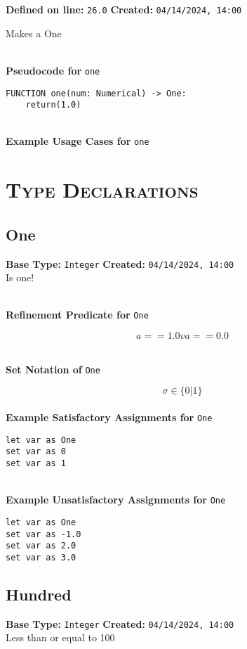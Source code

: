 \documentclass{article}
\begin{document}
\textbf{Defined on line:} \verb|26.0| \hfill \textbf{Created:} \verb|04/14/2024, 14:00| 


Makes a One

\textbf{\\ Pseudocode for } \texttt{one}
\begin{verbatim}
FUNCTION one(num: Numerical) -> One:
	return(1.0)
\end{verbatim}

\textbf{\\ Example Usage Cases for } \texttt{one}
\clearpage

\section{\textsc{Type Declarations}}

\subsection{One}
\textbf{Base Type:} \verb|Integer| \hfill \textbf{Created:} \verb|04/14/2024, 14:00| \\
Is one!

\textbf{\\ Refinement Predicate for } \texttt{One}

$$ a == 1.0 v a == 0.0 $$

\textbf{\\ Set Notation of } \texttt{One}

$$\sigma \in \{ 0 | 1 \}$$ \ \
\textbf{\\ Example Satisfactory Assignments for } \texttt{One}
\begin{verbatim}
let var as One
set var as 0
set var as 1
\end{verbatim}


\textbf{\\ Example Unsatisfactory Assignments for } \texttt{One}
\begin{verbatim}
let var as One
set var as -1.0
set var as 2.0
set var as 3.0
\end{verbatim}


\clearpage

\subsection{Hundred}
\textbf{Base Type:} \verb|Integer| \hfill \textbf{Created:} \verb|04/14/2024, 14:00| \\
Less than or equal to 100
\end{document}
